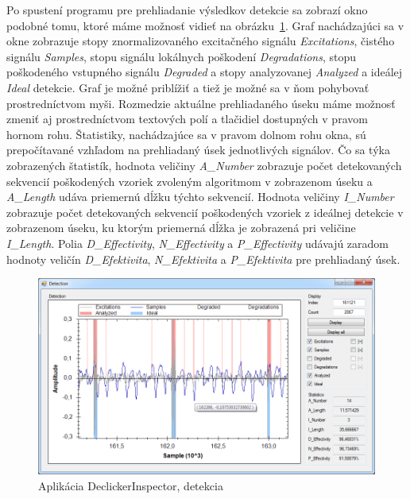 Po spustení programu pre prehliadanie výsledkov detekcie sa zobrazí okno podobné tomu, ktoré máme možnosť vidieť na obrázku~\ref{obrazok:inspector-detekcia}. Graf nachádzajúci sa v okne zobrazuje stopy znormalizovaného excitačného signálu \textit{Excitations}, čistého signálu \textit{Samples}, stopu signálu lokálnych poškodení \textit{Degradations}, stopu poškodeného vstupného signálu \textit{Degraded} a stopy analyzovanej \textit{Analyzed} a ideálej \textit{Ideal} detekcie. Graf je možné priblížiť a tiež je možné sa v ňom pohybovať prostredníctvom myši. Rozmedzie aktuálne prehliadaného úseku máme možnosť zmeniť aj prostredníctvom textových polí a tlačidiel dostupných v pravom hornom rohu. Štatistiky, nachádzajúce sa v pravom dolnom rohu okna, sú prepočítavané vzhľadom na prehliadaný úsek jednotlivých signálov. Čo sa týka zobrazených štatistík, hodnota veličiny \textit{A\_Number} zobrazuje počet detekovaných sekvencií poškodených vzoriek zvoleným algoritmom v zobrazenom úseku a \textit{A\_Length} udáva priemernú dĺžku týchto sekvencií. Hodnota veličiny \textit{I\_Number} zobrazuje počet detekovaných sekvencií poškodených vzoriek z ideálnej detekcie v zobrazenom úseku, ku ktorým priemerná dĺžka je zobrazená pri veličine \textit{I\_Length}. Polia \textit{D\_Effectivity}, \textit{N\_Effectivity} a \textit{P\_Effectivity} udávajú zaradom hodnoty veličín \textit{D\_Efektivita}, \textit{N\_Efektivita} a \textit{P\_Efektivita} pre prehliadaný úsek.

\begin{figure}[!h]
	\centering
	\includegraphics[width=1.0\textwidth]{images/detekcia.png}
	\caption{Aplikácia DeclickerInspector, detekcia}
	\label{obrazok:inspector-detekcia}
\end{figure}

